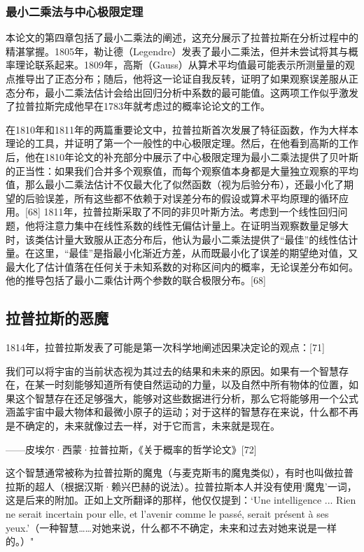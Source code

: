 \subsubsection{最小二乘法与中心极限定理}  
本论文的第四章包括了最小二乘法的阐述，这充分展示了拉普拉斯在分析过程中的精湛掌握。1805年，勒让德（Legendre）发表了最小二乘法，但并未尝试将其与概率理论联系起来。1809年，高斯（Gauss）从算术平均值最可能表示所测量量的观点推导出了正态分布；随后，他将这一论证自我反转，证明了如果观察误差服从正态分布，最小二乘法估计会给出回归分析中系数的最可能值。这两项工作似乎激发了拉普拉斯完成他早在1783年就考虑过的概率论论文的工作。

在1810年和1811年的两篇重要论文中，拉普拉斯首次发展了特征函数，作为大样本理论的工具，并证明了第一个一般性的中心极限定理。然后，在他看到高斯的工作后，他在1810年论文的补充部分中展示了中心极限定理为最小二乘法提供了贝叶斯的正当性：如果我们合并多个观察值，而每个观察值本身都是大量独立观察的平均值，那么最小二乘法估计不仅最大化了似然函数（视为后验分布），还最小化了期望的后验误差，所有这些都不依赖于对误差分布的假设或算术平均原理的循环应用。[68] 1811年，拉普拉斯采取了不同的非贝叶斯方法。考虑到一个线性回归问题，他将注意力集中在线性系数的线性无偏估计量上。在证明当观察数量足够大时，该类估计量大致服从正态分布后，他认为最小二乘法提供了“最佳”的线性估计量。在这里，“最佳”是指最小化渐近方差，从而既最小化了误差的期望绝对值，又最大化了估计值落在任何关于未知系数的对称区间内的概率，无论误差分布如何。他的推导包括了最小二乘估计两个参数的联合极限分布。[68]
\subsection{拉普拉斯的恶魔}  
1814年，拉普拉斯发表了可能是第一次科学地阐述因果决定论的观点：[71]  

我们可以将宇宙的当前状态视为其过去的结果和未来的原因。如果有一个智慧存在，在某一时刻能够知道所有使自然运动的力量，以及自然中所有物体的位置，如果这个智慧存在还足够强大，能够对这些数据进行分析，那么它将能够用一个公式涵盖宇宙中最大物体和最微小原子的运动；对于这样的智慧存在来说，什么都不再是不确定的，未来就像过去一样，对于它而言，未来就是现在。  

——皮埃尔·西蒙·拉普拉斯，《关于概率的哲学论文》[72]

这个智慧通常被称为拉普拉斯的魔鬼（与麦克斯韦的魔鬼类似），有时也叫做拉普拉斯的超人（根据汉斯·赖兴巴赫的说法）。拉普拉斯本人并没有使用‘魔鬼’一词，这是后来的附加。正如上文所翻译的那样，他仅仅提到：‘Une intelligence ... Rien ne serait incertain pour elle, et l’avenir comme le passé, serait présent à ses yeux.’（一种智慧……对她来说，什么都不不确定，未来和过去对她来说是一样的。）"

